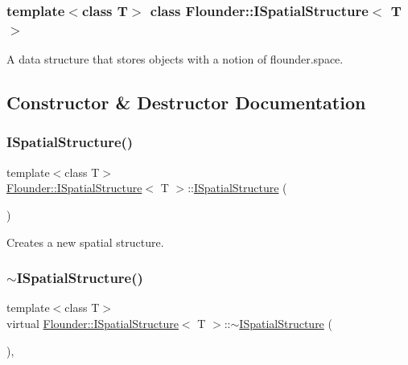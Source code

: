 \subsubsection*{template$<$class T$>$\newline
class Flounder\+::\+I\+Spatial\+Structure$<$ T $>$}

A data structure that stores objects with a notion of flounder.\+space. 



\subsection{Constructor \& Destructor Documentation}
\mbox{\label{class_flounder_1_1_i_spatial_structure_a002f6e822881e5425bd8e6a66d69b5ed}} 
\subsubsection{\texorpdfstring{I\+Spatial\+Structure()}{ISpatialStructure()}}
{\footnotesize\ttfamily template$<$class T$>$ \\
\hyperlink{class_flounder_1_1_i_spatial_structure}{Flounder\+::\+I\+Spatial\+Structure}$<$ T $>$\+::\hyperlink{class_flounder_1_1_i_spatial_structure}{I\+Spatial\+Structure} (\begin{DoxyParamCaption}{ }\end{DoxyParamCaption})\hspace{0.3cm}{\ttfamily [inline]}}



Creates a new spatial structure. 

\mbox{\label{class_flounder_1_1_i_spatial_structure_a3638dc91c3f8aea686b7262957caf3d1}} 
\subsubsection{\texorpdfstring{$\sim$\+I\+Spatial\+Structure()}{~ISpatialStructure()}}
{\footnotesize\ttfamily template$<$class T$>$ \\
virtual \hyperlink{class_flounder_1_1_i_spatial_structure}{Flounder\+::\+I\+Spatial\+Structure}$<$ T $>$\+::$\sim$\hyperlink{class_flounder_1_1_i_spatial_structure}{I\+Spatial\+Structure} (\begin{DoxyParamCaption}{ }\end{DoxyParamCaption})\hspace{0.3cm}{\ttfamily [inline]}, {\ttfamily [virtual]}}



